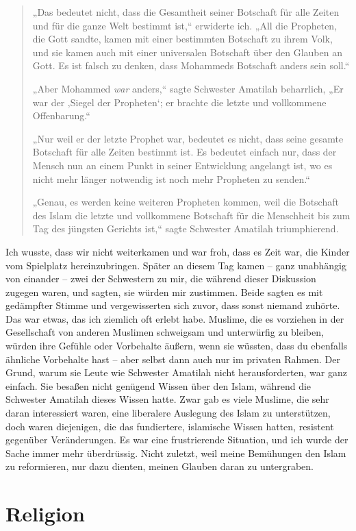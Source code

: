 \documentclass[12pt]{memoir}
\begin{document}
\begin{quote}
„Das bedeutet nicht, dass die Gesamtheit seiner Botschaft
für alle Zeiten und für die ganze Welt bestimmt ist,“
erwiderte ich.
„All die Propheten, die Gott sandte,
kamen mit einer bestimmten Botschaft zu ihrem Volk,
und sie kamen auch mit einer universalen Botschaft über den Glauben an Gott.
Es ist falsch zu denken, dass Mohammeds Botschaft anders sein soll.“

„Aber Mohammed \emph{war} anders,“ sagte Schwester Amatilah beharrlich,
„Er war der ‚Siegel der Propheten‘;
er brachte die letzte und vollkommene Offenbarung.“

„Nur weil er der letzte Prophet war, bedeutet es nicht,
dass seine gesamte Botschaft für alle Zeiten bestimmt ist.
Es bedeutet einfach nur,
dass der Mensch nun an einem Punkt in seiner Entwicklung angelangt ist,
wo es nicht mehr länger notwendig ist noch mehr Propheten zu senden.“

„Genau, es werden keine weiteren Propheten kommen,
weil die Botschaft des Islam die letzte und vollkommene Botschaft
für die Menschheit bis zum Tag des jüngsten Gerichts ist,“
sagte Schwester Amatilah triumphierend.
\end{quote}

Ich wusste, dass wir nicht weiterkamen und war froh,
dass es Zeit war, die Kinder vom Spielplatz hereinzubringen.
Später an diesem Tag kamen – ganz unabhängig von einander –
zwei der Schwestern zu mir, die während dieser Diskussion zugegen waren,
und sagten, sie würden mir zustimmen.
Beide sagten es mit gedämpfter Stimme und vergewisserten sich zuvor,
dass sonst niemand zuhörte.
Das war etwas, das ich ziemlich oft erlebt habe.
Muslime, die es vorziehen in der Gesellschaft von anderen Muslimen
schweigsam und unterwürfig zu bleiben,
würden ihre Gefühle oder Vorbehalte äußern,
wenn sie wüssten, dass du ebenfalls ähnliche Vorbehalte hast –
aber selbst dann auch nur im privaten Rahmen.
Der Grund, warum sie Leute wie Schwester Amatilah
nicht herausforderten, war ganz einfach.
Sie besaßen nicht genügend Wissen über den Islam,
während die Schwester Amatilah dieses Wissen hatte.
Zwar gab es viele Muslime, die sehr daran interessiert waren,
eine liberalere Auslegung des Islam zu unterstützen,
doch waren diejenigen, die das fundiertere, islamische Wissen hatten,
resistent gegenüber Veränderungen.
Es war eine frustrierende Situation,
und ich wurde der Sache immer mehr überdrüssig.
Nicht zuletzt, weil meine Bemühungen den Islam zu reformieren,
nur dazu dienten, meinen Glauben daran zu untergraben.


\chapter{Religion}
\end{document}
